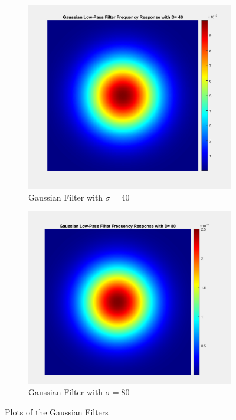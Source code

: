 \documentclass[a4paper]{article}
\begin{document}
\begin{figure}[h]
    \centering
    \begin{subfigure}{0.33\linewidth}
        \centering
        \includegraphics[width=\linewidth]{40_image_filter.png}
        \caption{Gaussian Filter with $\sigma = 40$}
    \end{subfigure}
    \begin{subfigure}{0.22\linewidth}
        \centering
        \includegraphics[width=\linewidth]{80_image_fil.png}
        \caption{Gaussian Filter with $\sigma = 80$}
    \end{subfigure}
    
    \caption{Plots of the Gaussian Filters}
    \label{fig:bo}
\end{figure}
\end{document}

